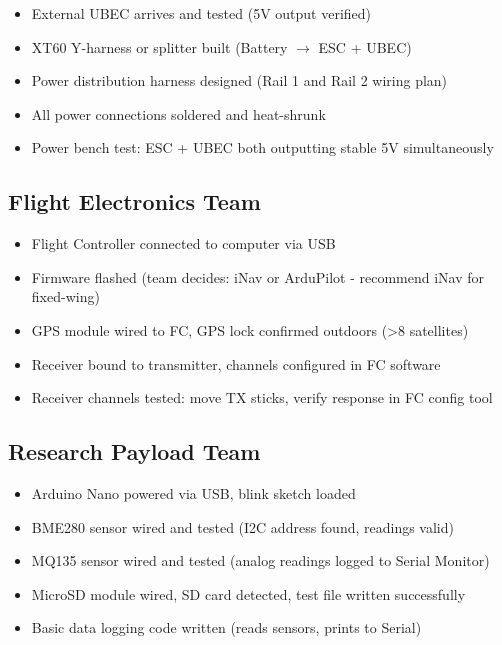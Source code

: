 \documentclass[11pt,letterpaper]{article}
\begin{document}
{\begin{itemize}
  \item External UBEC arrives and tested (5V output verified)
  \item XT60 Y-harness or splitter built (Battery $\rightarrow$ ESC + UBEC)
  \item Power distribution harness designed (Rail 1 and Rail 2 wiring plan)
  \item All power connections soldered and heat-shrunk
  \item Power bench test: ESC + UBEC both outputting stable 5V simultaneously
\end{itemize}

\subsection{Flight Electronics Team}

\begin{itemize}
  \item Flight Controller connected to computer via USB
  \item Firmware flashed (team decides: iNav or ArduPilot - recommend iNav for fixed-wing)
  \item GPS module wired to FC, GPS lock confirmed outdoors (>8 satellites)
  \item Receiver bound to transmitter, channels configured in FC software
  \item Receiver channels tested: move TX sticks, verify response in FC config tool
\end{itemize}

\subsection{Research Payload Team}

\begin{itemize}
  \item Arduino Nano powered via USB, blink sketch loaded
  \item BME280 sensor wired and tested (I2C address found, readings valid)
  \item MQ135 sensor wired and tested (analog readings logged to Serial Monitor)
  \item MicroSD module wired, SD card detected, test file written successfully
  \item Basic data logging code written (reads sensors, prints to Serial)
\end{itemize}

}
\end{document}
